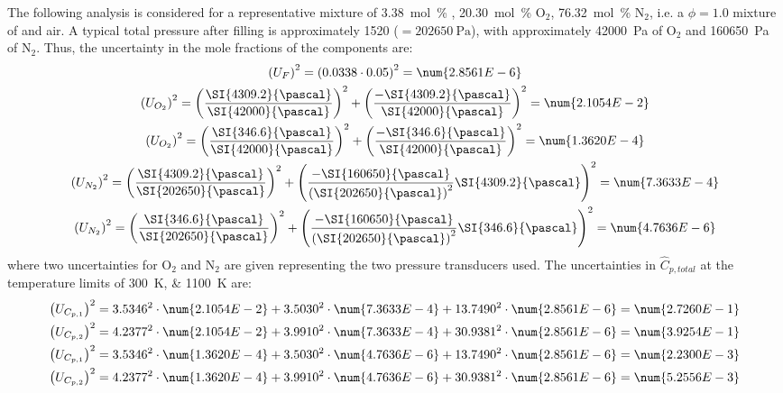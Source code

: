 \documentclass[../main.tex]{subfiles}
\begin{document}
The following analysis is considered for a representative mixture of
\SI{3.38}{\mole\percent} \tBuOH{}, \SI{20.30}{\mol\percent} O$_2$,
\SI{76.32}{\mole\percent} N$_2$, i.e. a $\phi=1.0$ mixture of \tBuOH{}
and air. A typical total pressure after filling is approximately
\SI{1520}{\torr} ($=\SI{202650}{\pascal}$), with approximately
\SI{42000}{\pascal} of O$_2$ and \SI{160650}{\pascal} of N$_2$. Thus,
the uncertainty in the mole fractions of the components are:
%
\begin{gather*}
\left(U_F\right)^2 = \left(0.0338 \cdot 0.05\right)^2 = \num{2.8561E-6} \\
\left(U_{O_2}\right)^2 = \left(\frac{\SI{4309.2}{\pascal}}{\SI{42000}{\pascal}}\right)^2 + \left(\frac{-\SI{4309.2}{\pascal}}{\SI{42000}{\pascal}}\right)^2 = \num{2.1054E-2} \\
\left(U_{O_2}\right)^2 = \left(\frac{\SI{ 346.6}{\pascal}}{\SI{42000}{\pascal}}\right)^2 + \left(\frac{-\SI{ 346.6}{\pascal}}{\SI{42000}{\pascal}}\right)^2 = \num{1.3620E-4} \\
\left(U_{N_2}\right)^2 = \left(\frac{\SI{4309.2}{\pascal}}{\SI{202650}{\pascal}}\right)^2 + \left(\frac{-\SI{160650}{\pascal}}{\left(\SI{202650}{\pascal}\right)^2}\SI{4309.2}{\pascal}\right)^2 = \num{7.3633E-4} \\
\left(U_{N_2}\right)^2 = \left(\frac{\SI{346.6}{\pascal}}{\SI{202650}{\pascal}}\right)^2 + \left(\frac{-\SI{160650}{\pascal}}{\left(\SI{202650}{\pascal}\right)^2}\SI{346.6}{\pascal}\right)^2 = \num{4.7636E-6}
\end{gather*}
%
where two uncertainties for O$_2$ and N$_2$ are given representing the two
pressure transducers used. The uncertainties in $\hat{C}_{p,total}$ at
the temperature limits of \SIlist{300;1100}{\kelvin} are:
%
\begin{gather*}
\left(U_{C_{p,1}}\right)^2 = 3.5346^2 \cdot \num{2.1054E-2} + 3.5030^2 \cdot \num{7.3633E-4} + 13.7490^2 \cdot \num{2.8561E-6} = \num{2.7260E-1} \\
\left(U_{C_{p,2}}\right)^2 = 4.2377^2 \cdot \num{2.1054E-2} + 3.9910^2 \cdot \num{7.3633E-4} + 30.9381^2 \cdot \num{2.8561E-6} = \num{3.9254E-1} \\
\left(U_{C_{p,1}}\right)^2 = 3.5346^2 \cdot \num{1.3620E-4} + 3.5030^2 \cdot \num{4.7636E-6} + 13.7490^2 \cdot \num{2.8561E-6} = \num{2.2300E-3} \\
\left(U_{C_{p,2}}\right)^2 = 4.2377^2 \cdot \num{1.3620E-4} + 3.9910^2 \cdot \num{4.7636E-6} + 30.9381^2 \cdot \num{2.8561E-6} = \num{5.2556E-3}
\end{gather*}
\end{document}
